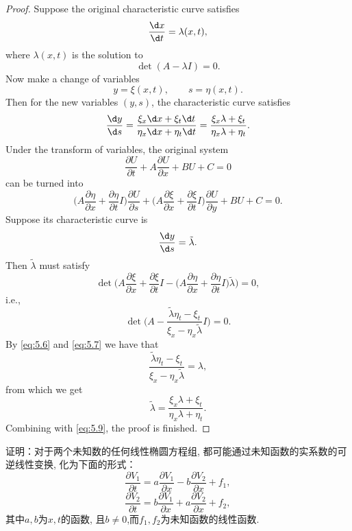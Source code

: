 \begin{proof}
  Suppose the original characteristic curve satisfies
  \[ \frac{\d x}{\d t} = \lambda(x,t), \]
  where $\lambda(x,t)$ is the solution to
  \begin{equation}\label{eq:5.6}
    \det(A-\lambda I) = 0.
  \end{equation}
  Now make a change of variables
  \[ y = \xi(x,t),\qquad s = \eta(x,t). \]
  Then for the new variables $(y,s)$, the characteristic curve satisfies
  \begin{equation}\label{eq:5.9}
    \frac{\d y}{\d s} = \frac{\xi_x \d x + \xi_t \d t}{\eta_x \d x + \eta_t \d t}
        = \frac{\xi_x \lambda + \xi_t}{\eta_x \lambda + \eta_t}.
  \end{equation}
  Under the transform of variables, the original system
  \[ \frac{\partial U}{\partial t} + A\frac{\partial U}{\partial x} + BU + C = 0 \]
  can be turned into
  \[ \biggl(A \frac{\partial\eta}{\partial x} + \frac{\partial\eta}{\partial t}I\biggr)
      \frac{\partial U}{\partial s}
      + \biggl(A \frac{\partial\xi}{\partial x} + \frac{\partial\xi}{\partial t}I\biggr)
        \frac{\partial U}{\partial y} + BU + C = 0. \]
  Suppose its characteristic curve is
  \[ \frac{\d y}{\d s} = \tilde\lambda. \] 
  Then $\tilde\lambda$ must satisfy
  \[\det\biggl(A \frac{\partial\xi}{\partial x} + \frac{\partial\xi}{\partial t}I
      - \biggl(A \frac{\partial\eta}{\partial x} + \frac{\partial\eta}{\partial t}I\biggr)\tilde\lambda\biggr) = 0,\]
  i.e.,
  \begin{equation}\label{eq:5.7}
    \det\biggl(A - \frac{\tilde\lambda \eta_t - \xi_t}{\xi_x - \eta_x \tilde\lambda}I\biggr) = 0.
  \end{equation}
  By \eqref{eq:5.6} and \eqref{eq:5.7} we have that
  \[ \frac{\tilde\lambda \eta_t - \xi_t}{\xi_x - \eta_x \tilde\lambda} = \lambda, \]
  from which we get
  \begin{equation}\label{eq:5.8}
    \tilde\lambda = \frac{\xi_x\lambda + \xi_t}{\eta_x\lambda + \eta_t}.
  \end{equation}
  Combining with \eqref{eq:5.9}, the proof is finished.
\end{proof}


\begin{exercise}
	证明：对于两个未知数的任何线性椭圆方程组, 都可能通过未知函数的实系数的可逆线性变换, 化为下面的形式：
	$$\frac{\partial V_1}{\partial t}=a\frac{\partial V_1}{\partial x}-b\frac{\partial V_2}{\partial x}+f_1,$$
	$$\frac{\partial V_2}{\partial t}=b\frac{\partial V_1}{\partial x}+a\frac{\partial V_2}{\partial x}+f_2,$$
	其中$a,b$为$x,t$的函数, 且$b\neq0$,而$f_1,f_{2}$为未知函数的线性函数.
\end{exercise}

